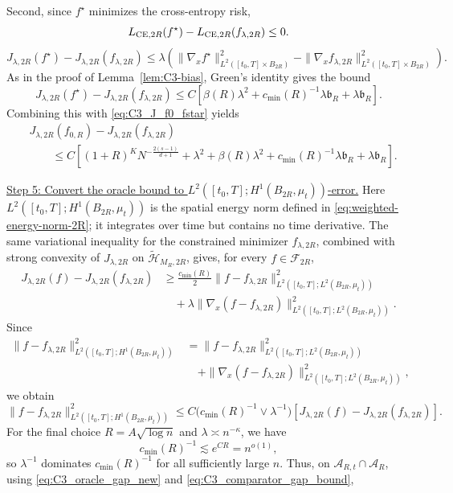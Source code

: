 \documentclass[11pt]{article}
\theoremstyle{plain}
\theoremstyle{definition}
\theoremstyle{remark}
\newcommand{\proofstep}[1]{\par\medskip\noindent\uline{#1}}
\begin{document}
Second, since \(f^\star\) minimizes the cross-entropy risk,
\[
L_{{\rm CE},2R}(f^\star)
-
L_{{\rm CE},2R}(f_{\lambda,2R})
\le0.
\]
\[
J_{\lambda,2R}(f^\star)-J_{\lambda,2R}(f_{\lambda,2R})
\le
\lambda\left(
\|\nabla_x f^\star\|_{L^2([t_0,T]\times B_{2R})}^2
-
\|\nabla_x f_{\lambda,2R}\|_{L^2([t_0,T]\times B_{2R})}^2
\right).
\]
As in the proof of Lemma~\ref{lem:C3-bias}, Green's identity gives the
bound
\[
J_{\lambda,2R}(f^\star)-J_{\lambda,2R}(f_{\lambda,2R})
\le
C\left[
\beta(R)\lambda^2
+
c_{\min}(R)^{-1}\lambda\mathfrak b_R
+
\lambda\mathfrak b_R
\right].
\]
Combining this with \eqref{eq:C3_J_f0_fstar} yields
\begin{equation}
\label{eq:C3_comparator_gap_bound}
\begin{aligned}
&J_{\lambda,2R}(f_{0,R})
-
J_{\lambda,2R}(f_{\lambda,2R})\\
&\qquad\le
C\left[
(1+R)^KN^{-\frac{2(s-1)}{d+1}}
+
\lambda^2
+
\beta(R)\lambda^2
+
c_{\min}(R)^{-1}\lambda\mathfrak b_R
+
\lambda\mathfrak b_R
\right].
\end{aligned}
\end{equation}

\proofstep{Step 5: Convert the oracle bound to
\(L^2([t_0,T];H^1(B_{2R},\mu_t))\)-error.}
Here \(L^2([t_0,T];H^1(B_{2R},\mu_t))\) is the spatial energy norm defined in
\eqref{eq:weighted-energy-norm-2R}; it integrates over time but contains no
time derivative.
The same variational inequality for the constrained minimizer
\(f_{\lambda,2R}\), combined with strong convexity of \(J_{\lambda,2R}\) on
\(\widetilde{\mathcal H}_{M_R,2R}\), gives, for every
\(f\in\mathcal F_{2R}\),
\[
\begin{aligned}
J_{\lambda,2R}(f)-J_{\lambda,2R}(f_{\lambda,2R})
&\ge
\frac{c_{\min}(R)}{2}
\|f-f_{\lambda,2R}\|_{L^2([t_0,T];L^2(B_{2R},\mu_t))}^2 \\
&\quad+
\lambda
\|\nabla_x(f-f_{\lambda,2R})\|_{L^2([t_0,T];L^2(B_{2R},\mu_t))}^2 .
\end{aligned}
\]
Since
\[
\begin{aligned}
\|f-f_{\lambda,2R}\|_{L^2([t_0,T];H^1(B_{2R},\mu_t))}^2
&=
\|f-f_{\lambda,2R}\|_{L^2([t_0,T];L^2(B_{2R},\mu_t))}^2\\
&\quad+
\|\nabla_x(f-f_{\lambda,2R})\|_{L^2([t_0,T];L^2(B_{2R},\mu_t))}^2,
\end{aligned}
\]
we obtain
\[
\|f-f_{\lambda,2R}\|_{L^2([t_0,T];H^1(B_{2R},\mu_t))}^2
\le
C\bigl(c_{\min}(R)^{-1}\vee\lambda^{-1}\bigr)
\left[
J_{\lambda,2R}(f)-J_{\lambda,2R}(f_{\lambda,2R})
\right].
\]
For the final choice \(R=A\sqrt{\log n}\) and
\(\lambda\asymp n^{-\kappa}\), we have
\[
c_{\min}(R)^{-1}\lesssim e^{CR}=n^{o(1)},
\]
so \(\lambda^{-1}\) dominates \(c_{\min}(R)^{-1}\) for all sufficiently large \(n\).
Thus, on \(\mathcal A_{R,t}\cap\mathcal A_R\), using
\eqref{eq:C3_oracle_gap_new} and
\eqref{eq:C3_comparator_gap_bound},
\end{document}

